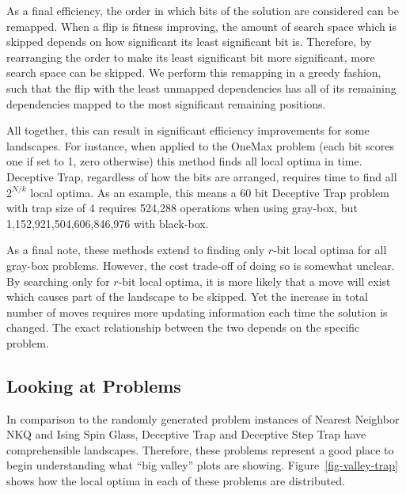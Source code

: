 As a final efficiency, the order in which bits of the solution are considered can be remapped. When a flip is fitness
improving, the amount of search space which is skipped depends on how significant its least significant bit is. Therefore,
by rearranging the order to make its least significant bit more significant, more search space can be skipped. We perform
this remapping in a greedy fashion, such that the flip with the least unmapped dependencies has all of its remaining dependencies
mapped to the most significant remaining positions.

All together, this can result in significant efficiency improvements for some landscapes. For instance, when applied to
the OneMax problem (each bit scores one if set to 1, zero otherwise) this method finds all local optima in  time.
Deceptive Trap, regardless of how the bits are arranged, requires  time to find all $2^{N/k}$ local optima.
As an example, this means a 60 bit
Deceptive Trap problem with trap size of 4 requires 524,288 operations when using gray-box, but 1,152,921,504,606,846,976
with black-box.

As a final note, these methods extend to finding only $r$-bit local optima for all gray-box problems. However,
the cost trade-off of doing so is somewhat unclear. By searching only for $r$-bit local optima, it is more likely
that a move will exist which causes part of the landscape to be skipped. Yet the increase in total number of moves
requires more updating information each time the solution is changed. The exact relationship between the two
depends on the specific problem.

\subsection{Looking at Problems}
In comparison to the randomly generated problem instances of Nearest Neighbor NKQ and Ising Spin Glass,
Deceptive Trap and Deceptive Step Trap have comprehensible landscapes. Therefore, these problems represent
a good place to begin understanding what ``big valley'' plots are showing. Figure~\ref{fig-valley-trap} shows
how the local optima in each of these problems are distributed.

